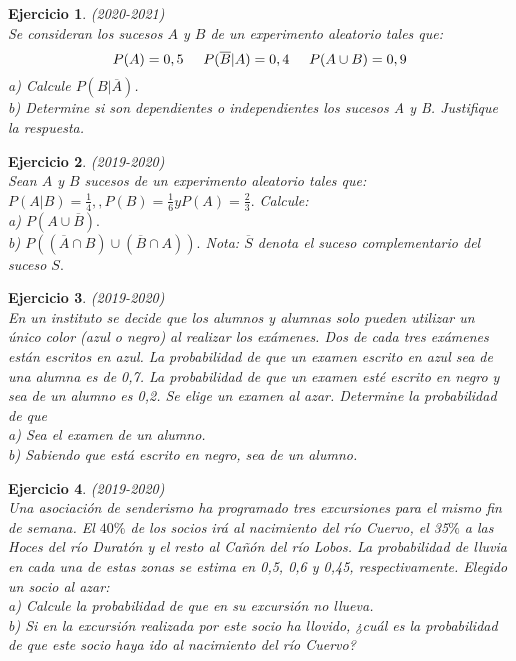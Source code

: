 \documentclass[12pt, a4paper]{amsart}
\newtheorem{ejer}{Ejercicio}
\begin{document}
\begin{ejer}\em (2020-2021)\\
Se consideran los sucesos $A$ y $B$ de un experimento aleatorio tales que:\\
\[P(A) = 0, 5\hspace*{5mm} P(\overline{B} | A) = 0, 4\hspace*{5mm}P(A \cup B) = 0,9\]
a) Calcule $P(B | \overline{A})$.\\
b) Determine si son dependientes o independientes los sucesos A y B. Justifique la respuesta.
\end{ejer}

\begin{ejer}\em (2019-2020)\\
Sean $A$ y $B$ sucesos de un experimento aleatorio tales que: $P (A|B) =\frac{1}{4}, , P (B) =\frac{1}{6}y P (A) =\frac{2}{3}.$ Calcule:\\
a) $P (A \cup \overline{B}).$\\
b) $P ((\overline{A} \cap B) \cup (\overline{B} \cap A)).$
Nota: $\overline{S}$ denota el suceso complementario del suceso $S.$
\end{ejer}

\begin{ejer}\em (2019-2020)\\
En un instituto se decide que los alumnos y alumnas solo pueden utilizar un único color (azul o negro) al realizar
los exámenes. Dos de cada tres exámenes están escritos en azul. La probabilidad de que un examen escrito en
azul sea de una alumna es de 0,7. La probabilidad de que un examen esté escrito en negro y sea de un alumno
es 0,2. Se elige un examen al azar. Determine la probabilidad de que\\
a) Sea el examen de un alumno.\\
b) Sabiendo que está escrito en negro, sea de un alumno.
\end{ejer}

\begin{ejer}\em (2019-2020)\\
Una asociación de senderismo ha programado tres excursiones para el mismo fin de semana. El $40\%$ de los
socios irá al nacimiento del río Cuervo, el 35$\%$ a las Hoces del río Duratón y el resto al Cañón del río Lobos.
La probabilidad de lluvia en cada una de estas zonas se estima en 0,5, 0,6 y 0,45, respectivamente. Elegido un
socio al azar:\\
a) Calcule la probabilidad de que en su excursión no llueva.\\
b) Si en la excursión realizada por este socio ha llovido, ¿cuál es la probabilidad de que este socio haya ido al
nacimiento del río Cuervo?
\end{ejer}
\end{document}
